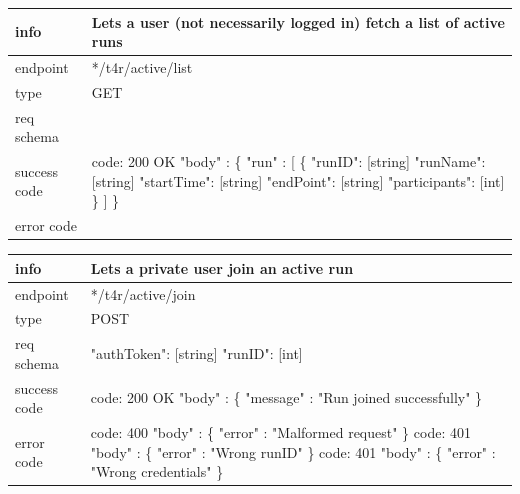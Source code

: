 \documentclass[titlepage]{article}
\begin{document}
\begin{tabularx}{\textwidth}{lX} \hline
    info & Lets a user (not necessarily logged in) fetch a list of active runs \\ \hline
    endpoint & */t4r/active/list \\ \hline
    type & GET \\ \hline
    req schema & \\ \hline
    success code &
        code: 200 OK \newline \newline 
        "body" : \{ \newline
        "run" : [ \{ \newline
        "runID": [string] \newline
        "runName": [string] \newline
        "startTime": [string] \newline
        "endPoint": [string] \newline
        "participants": [int] \newline
        \} ] \newline
        \} \\ \hline
    error code & \\ \hline
\end{tabularx}
		
\vspace{\baselineskip}

\begin{tabularx}{\textwidth}{lX} \hline
    info & Lets a private user join an active run \\ \hline
    endpoint & */t4r/active/join \\ \hline
    type & POST \\ \hline
    req schema & \newline
    "authToken": [string] \newline
    "runID": [int] \\ \hline
    success code &
        code: 200 OK \newline  
        "body" : \{ \newline
        "message" : "Run joined successfully" \newline
        \} \\ \hline
    error code &
        code: 400 \newline
        "body" : \{ "error" : "Malformed request" \} \newline \newline
        code: 401 \newline
        "body" : \{ "error" : "Wrong runID" \} \newline \newline
        code: 401 \newline
        "body" : \{ "error" : "Wrong credentials" \} \\ \hline
\end{tabularx}
		
\end{document}
